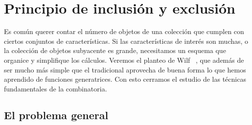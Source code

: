 %

\chapter{Principio de inclusión y exclusión}
\label{cha:pie}

  Es común querer contar el número de objetos de una colección
  que cumplen con ciertos conjuntos de características.
  Si las características de interés son muchas,
  o la colección de objetos subyacente es grande,
  necesitamos un esquema que organice y simplifique
  los cálculos.
  Veremos el planteo de Wilf~%
    \cite{wilf06:_gfology},
  que además de ser mucho más simple que el tradicional
  aprovecha de buena forma
  lo que hemos aprendido de funciones generatrices.
  Con esto cerramos el estudio de las técnicas fundamentales
  de la combinatoria.

\section{El problema general}
\label{sec:PIE-problema-general}

